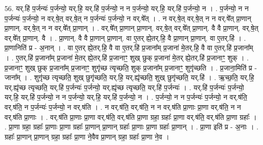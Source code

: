 \documentclass[17pt]{extarticle}
\begin{document}
56. यर्.हि॑ प॒र्जन्यः॑ प॒र्जन्यो॒ यर्.हि॒ यर्.हि॑ प॒र्जन्यो॒ न न प॒र्जन्यो॒ यर्.हि॒ यर्.हि॑ प॒र्जन्यो॒ न । . प॒र्जन्यो॒ न न प॒र्जन्यः॑ प॒र्जन्यो॒ न वर्.षे॒त् वर्.षे॒त् न प॒र्जन्यः॑ प॒र्जन्यो॒ न वर्.षे᳚त् । . न वर्.षे॒त् वर्.षे॒त् न न वर्.षे᳚त् प्रा॒णान् प्रा॒णान्. वर्.षे॒त् न न वर्.षे᳚त् प्रा॒णान् । . वर्.षे᳚त् प्रा॒णान् प्रा॒णान्. वर्.षे॒त् वर्.षे᳚त् प्रा॒णान्. वै वै प्रा॒णान्. वर्.षे॒त् वर्.षे᳚त् प्रा॒णान्. वै । . प्रा॒णान्. वै वै प्रा॒णान् प्रा॒णान्. वा ए॒तर् ह्ये॒तर्.हि॒ वै प्रा॒णान् प्रा॒णान्. वा ए॒तर्.हि॑ । . प्रा॒णानिति॑ प्र - अ॒नान् । . वा ए॒तर् ह्ये॒तर्.हि॒ वै वा ए॒तर्.हि॑ प्र॒जाना᳚म् प्र॒जाना॑ मे॒तर्.हि॒ वै वा ए॒तर्.हि॑ प्र॒जाना᳚म् । . ए॒तर्.हि॑ प्र॒जाना᳚म् प्र॒जाना॑ मे॒तर् ह्ये॒तर्.हि॑ प्र॒जानाꣳ॒॒ शुख् छुक् प्र॒जाना॑ मे॒तर् ह्ये॒तर्.हि॑ प्र॒जानाꣳ॒॒ शुक् । . प्र॒जानाꣳ॒॒ शुख् छुक् प्र॒जाना᳚म् प्र॒जानाꣳ॒॒ शुगृ॑च्छ त्यृच्छति॒ शुक् प्र॒जाना᳚म् प्र॒जानाꣳ॒॒ शुगृ॑च्छति । . प्र॒जाना॒मिति॑ प्र - जाना᳚म् । . शुगृ॑च्छ त्यृच्छति॒ शुख् छुगृ॑च्छति॒ यर्.हि॒ यर्.ह्यृ॑च्छति॒ शुख् छुगृ॑च्छति॒ यर्.हि॑ । . ऋ॒च्छ॒ति॒ यर्.हि॒ यर्.ह्यृ॑च्छ त्यृच्छति॒ यर्.हि॑ प॒र्जन्यः॑ प॒र्जन्यो॒ यर्.ह्यृ॑च्छ त्यृच्छति॒ यर्.हि॑ प॒र्जन्यः॑ । . यर्.हि॑ प॒र्जन्यः॑ प॒र्जन्यो॒ यर्.हि॒ यर्.हि॑ प॒र्जन्यो॒ न न प॒र्जन्यो॒ यर्.हि॒ यर्.हि॑ प॒र्जन्यो॒ न । . प॒र्जन्यो॒ न न प॒र्जन्यः॑ प॒र्जन्यो॒ न वर्.ष॑ति॒ वर्.ष॑ति॒ न प॒र्जन्यः॑ प॒र्जन्यो॒ न वर्.ष॑ति । . न वर्.ष॑ति॒ वर्.ष॑ति॒ न न वर्.ष॑ति प्रा॒णाः प्रा॒णा वर्.ष॑ति॒ न न वर्.ष॑ति प्रा॒णाः । . वर्.ष॑ति प्रा॒णाः प्रा॒णा वर्.ष॑ति॒ वर्.ष॑ति प्रा॒णा ग्रहा॒ ग्रहाः᳚ प्रा॒णा वर्.ष॑ति॒ वर्.ष॑ति प्रा॒णा ग्रहाः᳚ । . प्रा॒णा ग्रहा॒ ग्रहाः᳚ प्रा॒णाः प्रा॒णा ग्रहाः᳚ प्रा॒णान् प्रा॒णान् ग्रहाः᳚ प्रा॒णाः प्रा॒णा ग्रहाः᳚ प्रा॒णान् । . प्रा॒णा इति॑ प्र - अ॒नाः । . ग्रहाः᳚ प्रा॒णान् प्रा॒णान् ग्रहा॒ ग्रहाः᳚ प्रा॒णा ने॒वैव प्रा॒णान् ग्रहा॒ ग्रहाः᳚ प्रा॒णा ने॒व । \newline
\end{document}
